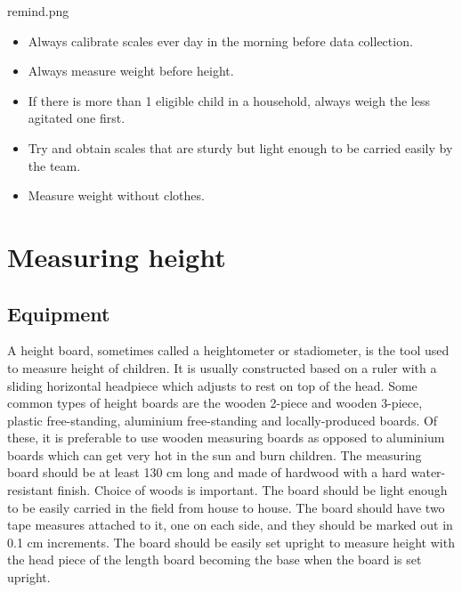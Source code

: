 \documentclass[
  12pt,
]{book}
\newenvironment{rmdremind}
  {\begin{tcolorbox}[width=\textwidth, 
                     colback = {white}, 
                     title = {\textbf{Remember}}, 
                     colbacktitle = lightgray,
                     coltitle = black]
  \begin{includegraphics}[scale = 1]{remind.png}
  \begin{itemize}}
  {\end{itemize}
  \end{includegraphics}
  \end{tcolorbox}}
\begin{document}
\begin{rmdremind}
\item

Always calibrate scales ever day in the morning before data collection.

\item

Always measure weight before height.

\item

If there is more than 1 eligible child in a household, always weigh the less agitated one first.

\item

Try and obtain scales that are sturdy but light enough to be carried easily by the team.

\item

Measure weight without clothes.
\end{rmdremind}

\hypertarget{height}{%
\chapter{Measuring height}\label{height}}

\hypertarget{equipment-1}{%
\section{Equipment}\label{equipment-1}}

A height board, sometimes called a heightometer or stadiometer, is the tool used to measure height of children. It is usually constructed based on a ruler with a sliding horizontal headpiece which adjusts to rest on top of the head. Some common types of height boards are the wooden 2-piece and wooden 3-piece, plastic free-standing, aluminium free-standing and locally-produced boards. Of these, it is preferable to use wooden measuring boards as opposed to aluminium boards which can get very hot in the sun and burn children. The measuring board should be at least 130 cm long and made of hardwood with a hard water-resistant finish. Choice of woods is important. The board should be light enough to be easily carried in the field from house to house. The board should have two tape measures attached to it, one on each side, and they should be marked out in 0.1 cm increments. The board should be easily set upright to measure height with the head piece of the length board becoming the base when the board is set upright.
\end{document}
